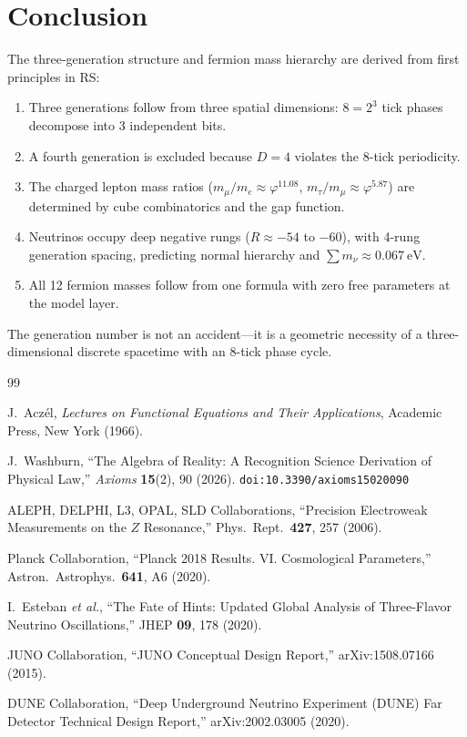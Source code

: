 \documentclass[12pt,a4paper]{article}
\theoremstyle{definition}
\theoremstyle{remark}
\begin{document}
\section{Conclusion}
\label{sec:conclusion}

The three-generation structure and fermion mass hierarchy are
derived from first principles in RS:
\begin{enumerate}
  \item Three generations follow from three spatial dimensions:
  $8 = 2^3$ tick phases decompose into 3 independent bits.
  \item A fourth generation is excluded because $D = 4$ violates
  the 8-tick periodicity.
  \item The charged lepton mass ratios ($m_\mu/m_e \approx
  \varphi^{11.08}$, $m_\tau/m_\mu \approx \varphi^{5.87}$)
  are determined by cube combinatorics and the gap function.
  \item Neutrinos occupy deep negative rungs
  ($R \approx -54$ to $-60$), with 4-rung generation spacing,
  predicting normal hierarchy and
  $\sum m_\nu \approx 0.067~\mathrm{eV}$.
  \item All 12 fermion masses follow from one formula with
  zero free parameters at the model layer.
\end{enumerate}

The generation number is not an accident---it is a geometric
necessity of a three-dimensional discrete spacetime with an
8-tick phase cycle.

\begin{thebibliography}{99}

J.~Acz\'el, \textit{Lectures on Functional Equations and Their
Applications}, Academic Press, New York (1966).

J.~Washburn, ``The Algebra of Reality: A Recognition Science Derivation
of Physical Law,'' \emph{Axioms} \textbf{15}(2), 90 (2026).
\texttt{doi:10.3390/axioms15020090}

ALEPH, DELPHI, L3, OPAL, SLD Collaborations,
``Precision Electroweak Measurements on the $Z$ Resonance,''
Phys.\ Rept.\ \textbf{427}, 257 (2006).

Planck Collaboration, ``Planck 2018 Results. VI. Cosmological
Parameters,'' Astron.\ Astrophys.\ \textbf{641}, A6 (2020).

I.~Esteban \textit{et al.}, ``The Fate of Hints: Updated
Global Analysis of Three-Flavor Neutrino Oscillations,''
JHEP \textbf{09}, 178 (2020).

JUNO Collaboration, ``JUNO Conceptual Design Report,''
arXiv:1508.07166 (2015).

DUNE Collaboration, ``Deep Underground Neutrino Experiment
(DUNE) Far Detector Technical Design Report,''
arXiv:2002.03005 (2020).

\end{thebibliography}
\end{document}
